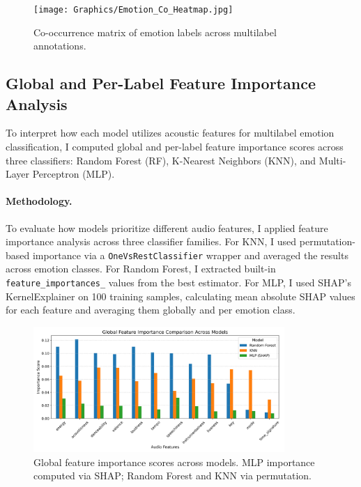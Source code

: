 \documentclass{article}
\begin{document}
\begin{figure}[H]
\centering
\texttt{[image: Graphics/Emotion\_Co\_Heatmap.jpg]}
\caption{Co-occurrence matrix of emotion labels across multilabel annotations.}
\label{fig:emotion_cooccur}
\end{figure}



\subsection{Global and Per-Label Feature Importance Analysis}

To interpret how each model utilizes acoustic features for multilabel emotion classification, I computed global and per-label feature importance scores across three classifiers: Random Forest (RF), K-Nearest Neighbors (KNN), and Multi-Layer Perceptron (MLP).

\paragraph{Methodology.} To evaluate how models prioritize different audio features, I applied feature importance analysis across three classifier families. For KNN, I used permutation-based importance via a \texttt{OneVsRestClassifier} wrapper and averaged the results across emotion classes. For Random Forest, I extracted built-in \texttt{feature\_importances\_} values from the best estimator. For MLP, I used SHAP’s KernelExplainer on 100 training samples, calculating mean absolute SHAP values for each feature and averaging them globally and per emotion class.

\begin{figure}[H]
\centering
\includegraphics[width=0.85\textwidth]{Graphics/global_feature_importance_comparison.png}
\caption{Global feature importance scores across models. MLP importance computed via SHAP; Random Forest and KNN via permutation.}
\label{fig:feature_importance}
\end{figure}
\end{document}
